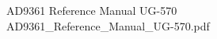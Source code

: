 \documentclass{article}
\begin{document}


 \begin{thebibliography}{1}


  AD9361 Reference Manual UG-570\\
 AD9361\_Reference\_Manual\_UG-570.pdf
 \end{thebibliography}
\end{document}
